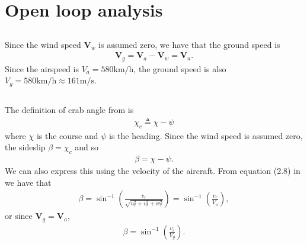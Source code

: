 \section{Open loop analysis}

\subsection{}
Since the wind speed $\mathbf{V}_w$ is assumed zero, we have that the ground speed is
\begin{equation}\begin{aligned}
\label{eq:ground_air}
\mathbf{V}_g = \mathbf{V}_a - \mathbf{V}_w = \mathbf{V}_a.
\end{aligned}\end{equation}
Since the airspeed is $V_a = 580 \si{\kilo \meter / \hour}$, the ground speed is also $V_g = 580 \si{\kilo \meter / \hour} \approx 161 \si{\meter / \second}$.
\subsection{}
The definition of crab angle from \cite{beard_mclain_2012} is
\begin{equation}\begin{aligned}
\chi_c \triangleq \chi - \psi
\end{aligned}\end{equation}
where $\chi$ is the course and $\psi$ is the heading. Since the wind speed is assumed zero, the sideslip $\beta = \chi_c$ and so
\begin{equation}\begin{aligned}
\beta = \chi - \psi.
\end{aligned}\end{equation}
We can also express this using the velocity of the aircraft. From equation (2.8) in \cite{beard_mclain_2012} we have that
\begin{equation}\begin{aligned}
\beta = \sin^{-1}\left(\frac{v_r}{\sqrt{u^2_r + v^2_r + w^2_r}}\right) = \sin^{-1}\left(\frac{v_r}{V_a}\right),
\end{aligned}\end{equation}
or since $\mathbf{V}_g = \mathbf{V}_a$,
\begin{equation}\begin{aligned}
\beta = \sin^{-1}\left(\frac{v_r}{V_g}\right).
\end{aligned}\end{equation}

